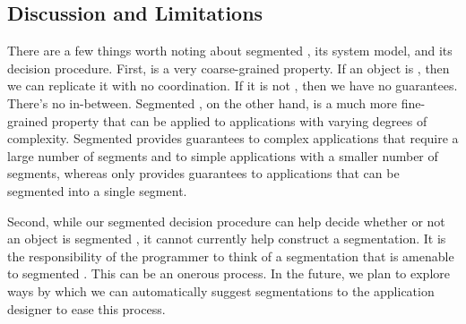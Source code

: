 \subsection{Discussion and Limitations}
There are a few things worth noting about segmented \invariantconfluence{}, its
system model, and its decision procedure.
%
First, \invariantconfluence{} is a very coarse-grained property. If an object
is \invariantconfluent{}, then we can replicate it with no coordination. If it
is not \invariantconfluent{}, then we have no guarantees. There's no
in-between.  Segmented \invariantconfluence{}, on the other hand, is a much
more fine-grained property that can be applied to applications with varying
degrees of complexity. Segmented \invariantconfluence{} provides guarantees to
complex applications that require a large number of segments and to simple
applications with a smaller number of segments, whereas \invariantconfluence{}
only provides guarantees to applications that can be segmented into a single
segment.

Second, while our segmented \invariantconfluence{} decision procedure can help
decide whether or not an object is segmented \invariantconfluent{}, it cannot
currently help construct a segmentation. It is the responsibility of the
programmer to think of a segmentation that is amenable to segmented
\invariantconfluence{}. This can be an onerous process. In the future, we
plan to explore ways by which we can automatically suggest segmentations to the
application designer to ease this process.

